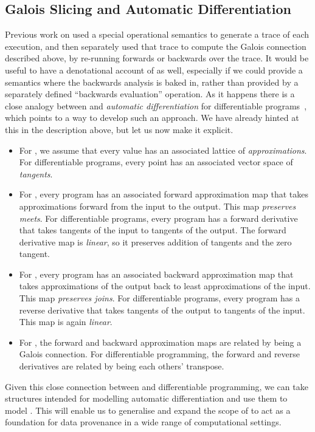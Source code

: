 \subsection{Galois Slicing and Automatic Differentiation}

Previous work on \GPS used a special operational semantics to generate a trace of each execution, and then separately used that trace to compute the Galois connection described above, by re-running forwards or backwards over the trace. It would be useful to have a denotational account of \GPS as well, especially if we could provide a semantics where the backwards analysis is baked in, rather than provided by a separately defined ``backwards evaluation'' operation. As it happens there is a close analogy between \GPS and \emph{automatic differentiation} for differentiable programs~\cite{siskind08,elliott18,vakar22}, which points to a way to develop such an approach. We have already hinted at this in the description above, but let us now make it explicit.

\begin{itemize}
\item For \GPS, we assume that every value has an associated lattice of {\em approximations}. For differentiable programs, every point has an associated vector space of {\em tangents}.
\item For \GPS, every program has an associated forward approximation map that takes approximations forward from the input to the output. This map {\em preserves meets}. For differentiable programs, every program has a forward derivative that takes tangents of the input to tangents of the output. The forward derivative map is {\em linear}, so it preserves addition of tangents and the zero tangent.
\item For \GPS, every program has an associated backward approximation map that takes approximations of the output back to least approximations of the input. This map {\em preserves joins}. For differentiable programs, every program has a reverse derivative that takes tangents of the output to tangents of the input. This map is again {\em linear}.
\item For \GPS, the forward and backward approximation maps are related by being a Galois connection. For differentiable programming, the forward and reverse derivatives are related by being each others' transpose.
\end{itemize}

Given this close connection between \GPS and differentiable programming, we can take structures intended for modelling automatic differentiation and use them to model \GPS. This will enable us to generalise and expand the scope of \GPS to act as a foundation for data provenance in a wide range of computational settings.

